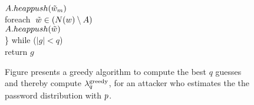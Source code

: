 \begin{figure}[t]
{    \aindent $A.\relax{heappush}(\tilde{w}_m)$\\
    \aindent foreach $\;\tilde{w} \in \left(N({w})\setminus A\right)\; $\\
    \aindent \aindent $A.\relax{heappush}(\tilde{w})$\\
    \} while ($|g|<q$)\\
    return $g$
  }
  \caption{Figure presents a greedy algorithm to compute the best $q$
    guesses and thereby compute $\lambda^\textnormal{greedy}_q$, for an attacker who
    estimates the the password distribution with $p$. %
  }
  \label{fig:attack-algo}
\end{figure}











